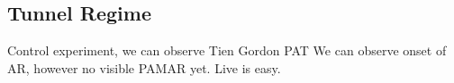 \subsection{Tunnel Regime}
\label{subsec:ac:tunneling}

    Control experiment, we can observe Tien Gordon PAT
    We can observe onset of AR,
    however no visible PAMAR yet.
    Live is easy.



